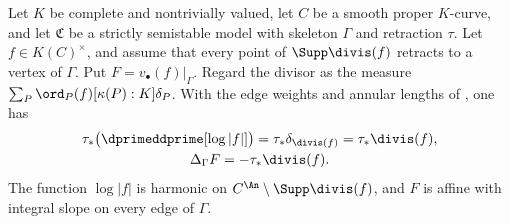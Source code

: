 \begin{theorem}
\label{thm:ch19-curve-slope-formula}
Let $K$ be complete and nontrivially valued, let $C$ be a smooth proper
$K$-curve, and let $\mathfrak C$ be a strictly semistable model with
skeleton $\Gamma$ and retraction $\tau$.  Let $f\in K(C)^\times$,
and assume that every point of $\Supp\divis(f)$ retracts to a vertex
of $\Gamma$.  Put $F=v_\bullet(f)|_\Gamma$.
Regard the divisor as the measure
$\sum_P\ord_P(f)[\kappa(P):K]\delta_P$.
With the edge weights and annular lengths of
, one has
\begin{equation}
\label{eq:ch19-slope-from-pl}
\begin{gathered}
 \tau_*\bigl(\dprimeddprime[\log|f|]\bigr)
     =\tau_*\delta_{\divis(f)}
     =\tau_*\divis(f),\\
                    \Delta_\Gamma F=-\tau_*\divis(f).
\end{gathered}
\end{equation}
The function $\log|f|$ is harmonic on
$C^{\An}\setminus\Supp\divis(f)$, and $F$ is affine with integral
slope on every edge of $\Gamma$.
\end{theorem}

